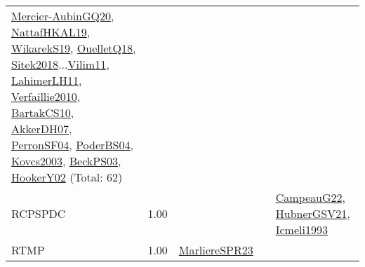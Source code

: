 {\begin{longtable}{p{3cm}r>{\raggedright\arraybackslash}p{6cm}>{\raggedright\arraybackslash}p{6cm}>{\raggedright\arraybackslash}p{8cm}}
\hyperref[detail:Mercier-AubinGQ20]{Mercier-AubinGQ20}, \hyperref[detail:NattafHKAL19]{NattafHKAL19}, \hyperref[detail:WikarekS19]{WikarekS19}, \hyperref[detail:OuelletQ18]{OuelletQ18}, \hyperref[detail:Sitek2018]{Sitek2018}...\hyperref[detail:Vilim11]{Vilim11}, \hyperref[detail:LahimerLH11]{LahimerLH11}, \hyperref[detail:Verfaillie2010]{Verfaillie2010}, \hyperref[detail:BartakCS10]{BartakCS10}, \hyperref[detail:AkkerDH07]{AkkerDH07}, \hyperref[detail:PerronSF04]{PerronSF04}, \hyperref[detail:PoderBS04]{PoderBS04}, \hyperref[detail:Kovcs2003]{Kovcs2003}, \hyperref[detail:BeckPS03]{BeckPS03}, \hyperref[detail:HookerY02]{HookerY02} (Total: 62)\\
\index{RCPSPDC}\index{Classification!RCPSPDC}RCPSPDC &  1.00 &  &  & \hyperref[detail:CampeauG22]{CampeauG22}, \hyperref[detail:HubnerGSV21]{HubnerGSV21}, \hyperref[detail:Icmeli1993]{Icmeli1993}\\
\index{RTMP}\index{Classification!RTMP}RTMP &  1.00 & \hyperref[detail:MarliereSPR23]{MarliereSPR23} &  & \\

\end{longtable}}
